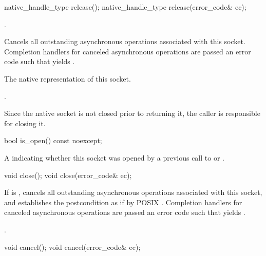 \begin{itemdecl}
native_handle_type release();
native_handle_type release(error_code& ec);
\end{itemdecl}

\begin{itemdescr}
\pnum
\requires {}.

\pnum
\effects Cancels all outstanding asynchronous operations associated with this socket.
Completion handlers for canceled asynchronous operations are passed an error code 
such that  yields .

\pnum
\returns The native representation of this socket.

\pnum
\postconditions {}.

\pnum
\remarks Since the native socket is not closed prior to returning it,
the caller is responsible for closing it.
\end{itemdescr}

\begin{itemdecl}
bool is_open() const noexcept;
\end{itemdecl}

\begin{itemdescr}
\pnum
\returns A  indicating whether this socket was opened by a previous call to  or .
\end{itemdescr}

\begin{itemdecl}
void close();
void close(error_code& ec);
\end{itemdecl}

\begin{itemdescr}
\pnum
\effects If  is , cancels all outstanding asynchronous operations associated with this socket, and establishes the postcondition as if by POSIX . Completion handlers for canceled asynchronous operations are passed an error code  such that  yields .

\pnum
\postconditions {}.
\end{itemdescr}

\begin{itemdecl}
void cancel();
void cancel(error_code& ec);
\end{itemdecl}

